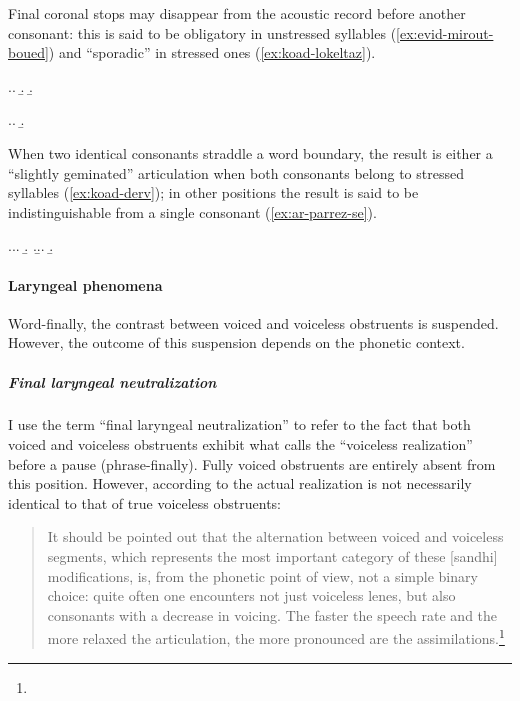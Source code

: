 Final coronal stops may disappear from the acoustic record before another consonant: this is said to be obligatory in unstressed syllables (\cref{ex:evid-mirout-boued}) and \enquote{sporadic} in stressed ones (\cref{ex:koad-lokeltaz}).

\ex.\label{ex:evid-mirout-boued}\a.
\b.
\b.

\ex.\label{ex:koad-lokeltaz}\a.
\b.

When two identical consonants straddle a word boundary, the result is either a \enquote{slightly geminated} articulation when both consonants belong to stressed syllables (\cref{ex:koad-derv}); in other positions the result is said to be indistinguishable from a single consonant (\cref{ex:ar-parrez-se}).

\ex.\a.\label{ex:koad-derv}\a.
\b.
\z.\b.\label{ex:ar-parrez-se}\a.
\b.

\paragraph{Laryngeal phenomena}
\label{sec:laryngeal-phenomena}

Word-finally, the contrast between voiced and voiceless obstruents is suspended. However, the outcome of this suspension depends on the phonetic context.

\subparagraph{Final laryngeal neutralization}
\label{sec:final-laryng-neutr-phon}

I use the term \enquote{final laryngeal neutralization} \citep[\cfm][]{iverson11:_final} to refer to the fact that both voiced and voiceless obstruents exhibit what \citet[p.~190]{humphreys95:_phonol_bothoa_saint_nicol_pelem} calls the \enquote{voiceless realization} before a pause (\ie phrase-finally). Fully voiced obstruents are entirely absent from this position. However, according to \citet{humphreys95:_phonol_bothoa_saint_nicol_pelem}  the actual realization is not necessarily identical to that of true voiceless obstruents:

\blockquote{It should be pointed out that the alternation between voiced and voiceless segments, which represents the most important category of these [sandhi] modifications, is, from the phonetic point of view, not a simple binary choice: quite often one encounters not just voiceless lenes, but also consonants with a decrease in voicing. The faster the speech rate and the more relaxed the articulation, the more pronounced are the assimilations.\footnote{}}

